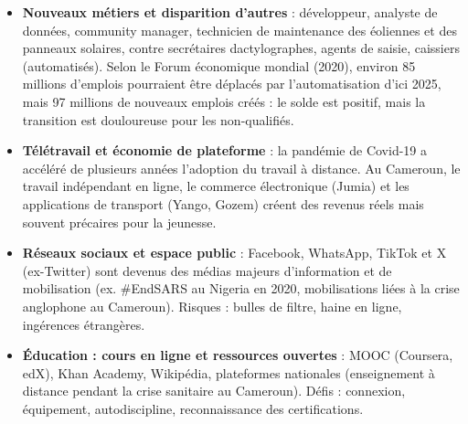 \documentclass[11pt]{article}
\begin{document}
\begin{aretenir}
\begin{itemize}
    \item \textbf{Nouveaux métiers et disparition d'autres} : développeur, analyste de données, community manager, technicien de maintenance des éoliennes et des panneaux solaires, contre secrétaires dactylographes, agents de saisie, caissiers (automatisés). Selon le Forum économique mondial (2020), environ 85 millions d'emplois pourraient être déplacés par l'automatisation d'ici 2025, mais 97 millions de nouveaux emplois créés : le solde est positif, mais la transition est douloureuse pour les non-qualifiés.
    \item \textbf{Télétravail et économie de plateforme} : la pandémie de Covid-19 a accéléré de plusieurs années l'adoption du travail à distance. Au Cameroun, le travail indépendant en ligne, le commerce électronique (Jumia) et les applications de transport (Yango, Gozem) créent des revenus réels mais souvent précaires pour la jeunesse.
    \item \textbf{Réseaux sociaux et espace public} : Facebook, WhatsApp, TikTok et X (ex-Twitter) sont devenus des médias majeurs d'information et de mobilisation (ex. \#EndSARS au Nigeria en 2020, mobilisations liées à la crise anglophone au Cameroun). Risques : bulles de filtre, haine en ligne, ingérences étrangères.
    \item \textbf{Éducation : cours en ligne et ressources ouvertes} : MOOC (Coursera, edX), Khan Academy, Wikipédia, plateformes nationales (enseignement à distance pendant la crise sanitaire au Cameroun). Défis : connexion, équipement, autodiscipline, reconnaissance des certifications.
\end{itemize}
\end{aretenir}
\end{document}
